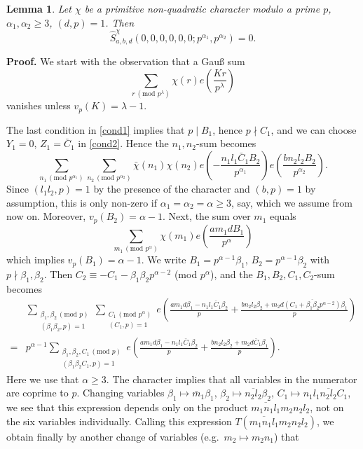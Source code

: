 \documentclass[11pt]{amsart}
\theoremstyle{plain}
\newtheorem{lemma}{Lemma}
\numberwithin{equation}{section}
\theoremstyle{definition}
\renewcommand{\geq}{\geqslant}
\begin{document}
 \begin{lemma}\label{zero} Let $\chi$ be a primitive non-quadratic character modulo a prime $p$, $\alpha_1, \alpha_2 \geq 3$, $(d, p) = 1$. Then 
 $$ \widehat{S}^{\chi}_{a, b, d}(0, 0, 0, 0, 0, 0; p^{\alpha_1}, p^{\alpha_2}) = 0.$$
 \end{lemma} 
 
 \textbf{Proof.} We start with the observation that a Gau{\ss} sum
 $$\sum_{r \, (\text{mod } p^{\lambda})} \chi( r)e\left(\frac{Kr}{p^{\lambda}}\right)$$
 vanishes unless $v_p(K) = \lambda - 1$. 
 
The last condition in \eqref{cond1} implies that $p \mid B_1$, hence $p \nmid C_1$, and we can choose $Y_1 = 0$, $Z_1 = \bar{C}_1$ in \eqref{cond2}.   Hence the $n_1, n_2$-sum becomes
 $$\sum_{n_1 \, (\text{mod }p^{\alpha_1})}\sum_{n_2 \, (\text{mod }p^{\alpha_2})}\bar{\chi}(n_1) \chi(n_2)e\left(-\frac{n_1l_1\bar{C}_1 B_2}{p^{\alpha_1}}\right)e\left(\frac{bn_2l_2B_2}{p^{\alpha_2}}\right).$$
 Since $(l_1l_2, p)=1$ by the presence of the character and $(b, p) = 1$ by assumption, this is only non-zero if $\alpha_1 = \alpha_2 = \alpha \geq 3$, say,  which we assume from now on. Moreover, $v_p(B_2) = \alpha - 1$. Next, the sum over $m_1$ equals
 $$\sum_{m_1 \, (\text{mod } p^{\alpha})} \chi(m_1)e\left(\frac{am_1dB_1}{p^{\alpha}}\right)$$
 which implies $v_p(B_1) = \alpha - 1$. We write $B_1 = p^{\alpha-1} \beta_1$, $B_2 = p^{\alpha -1} \beta_2$ with $p \nmid \beta_1, \beta_2$. Then $C_2 \equiv -C_1 - \beta_1\beta_2 p^{\alpha-2}$ (mod $p^{\alpha}$), and the $B_1, B_2, C_1, C_2$-sum becomes
 \begin{displaymath}
 \begin{split}
&   \sum_{\substack{\beta_1, \beta_2 \, (\text{mod } p)\\ (\beta_1\beta_2, p) = 1}} \sum_{\substack{C_1 \, (\text{mod } p^{\alpha})\\ (C_1, p) = 1}} e\left(\frac{am_1d \beta_1   - n_1l_1\bar{C}_1 \beta_2}{p} + \frac{bn_2l_2\beta_2 + m_2d \overline{(C_1 + \beta_1\beta_2p^{\alpha-2})} \beta_1}{p}\right)\\
= & p^{\alpha-1} \sum_{\substack{\beta_1, \beta_2, C_1 \, (\text{mod } p)\\ (\beta_1\beta_2C_1, p) = 1}}   e\left(\frac{am_1d \beta_1   - n_1l_1\bar{C}_1 \beta_2}{p} + \frac{bn_2l_2\beta_2 + m_2d \bar{C}_1 \beta_1}{p}\right). 
   \end{split}
 \end{displaymath}
 Here we use that $\alpha \geq 3$. 
 The character implies that all variables in the numerator are coprime to $p$. Changing variables $\beta_1 \mapsto \bar{m}_1\beta_1$, $\beta_2\mapsto \overline{n_2l_2}\beta_2$, $C_1\mapsto n_1l_1\overline{n_2l_2}C_1$, we see that this expression depends only on the product $\overline{m_1 n_1l_1}  m_2n_2l_2$, not on the six variables individually. Calling this expression $T(\overline{m_1n_1l_1} m_2n_2l_2)$, we obtain finally by another change of variables (e.g.\ $m_2 \mapsto m_2n_1$) that 
\end{document}
